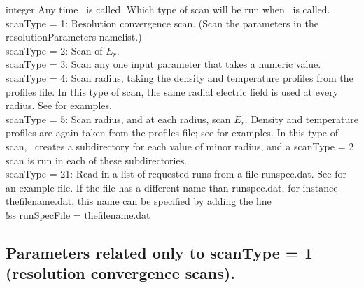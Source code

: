 \myhrule

{integer}
{Any time \sfincsScan~is called.}
{Which type of scan will be run when \sfincsScan~is called. \\

{\ttfamily scanType} = 1:  Resolution convergence scan. (Scan the parameters in the resolutionParameters namelist.)\\

{\ttfamily scanType} = 2:  Scan of $E_r$.\\

{\ttfamily scanType} = 3:  Scan any one input parameter that takes a numeric value.\\

{\ttfamily scanType} = 4:  Scan radius, taking the density and temperature profiles from the {\ttfamily profiles} file.
In this type of scan, the same radial electric field is used at every radius.
See  for examples.\\

{\ttfamily scanType} = 5:  Scan radius, and at each radius, scan $E_r$.  Density and temperature profiles are again
 taken from the {\ttfamily profiles} file; see  for examples.
In this type of scan, \sfincsScan~creates a subdirectory for each value of minor radius, and a
{\ttfamily scanType} = 2 scan is run in each of these subdirectories.
\\

{\ttfamily scanType} = 21: Read in a list of requested runs from a
file {\ttfamily runspec.dat}. See
 for an example file. If the
file has a different name than {\ttfamily runspec.dat}, for instance
{\ttfamily thefilename.dat}, this name can be
specified by adding the line\\
{\ttfamily
!ss runSpecFile = thefilename.dat\\
}
}



\subsection{Parameters related only to {\ttfamily scanType} = 1 (resolution convergence scans).}
\label{sec:scanType1Parameters}

